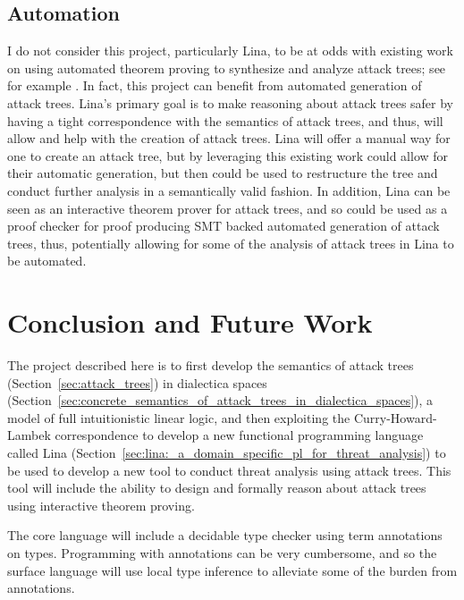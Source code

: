 \documentclass{sigplanconf}
\begin{document}
\subsection{Automation}
\label{subsec:automation}
I do not consider this project, particularly Lina, to be at odds with
existing work on using automated theorem proving to synthesize and
analyze attack trees; see for example
\cite{essay69399,Sheyner:2002:AGA:829514.830526,6957121,essay69402}.
In fact, this project can benefit from automated generation of attack
trees.  Lina's primary goal is to make reasoning about attack trees
safer by having a tight correspondence with the semantics of attack
trees, and thus, will allow and help with the creation of attack
trees.  Lina will offer a manual way for one to create an attack tree,
but by leveraging this existing work could allow for their automatic
generation, but then could be used to restructure the tree and conduct
further analysis in a semantically valid fashion.  In addition, Lina
can be seen as an interactive theorem prover for attack trees, and so
could be used as a proof checker \cite{Stump:2012} for proof producing
SMT backed automated generation of attack trees, thus, potentially
allowing for some of the analysis of attack trees in Lina to be
automated.

\section{Conclusion and Future Work}
\label{sec:conclusion}

The project described here is to first develop the semantics of attack
trees (Section~\ref{sec:attack_trees}) in dialectica spaces
(Section~\ref{sec:concrete_semantics_of_attack_trees_in_dialectica_spaces}),
a model of full intuitionistic linear logic, and then exploiting the
Curry-Howard-Lambek correspondence to develop a new functional
programming language called Lina
(Section~\ref{sec:lina:_a_domain_specific_pl_for_threat_analysis}) to
be used to develop a new tool to conduct threat analysis using attack
trees.  This tool will include the ability to design and formally
reason about attack trees using interactive theorem proving.

The core language will include a decidable type checker
using term annotations on types.  Programming with annotations can be
very cumbersome, and so the surface language will use local type
inference \cite{Pierce:2000} to alleviate some of the burden from
annotations.  
\end{document}
